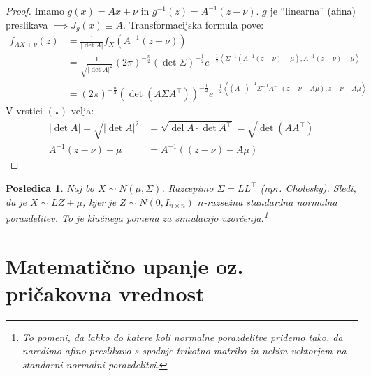 \documentclass[12pt]{book}
\theoremstyle{definition}
\theoremstyle{plain}
\theoremstyle{plain}
\theoremstyle{plain}
\theoremstyle{plain}
\newtheorem{posledica}{Posledica}
\theoremstyle{remark}
\begin{document}
\begin{proof}
    Imamo $g(x)=A x+\nu$ in $g^{-1}(z)=A^{-1}(z-\nu)$. $g$ je “linearna” (afina) preslikava $\implies J_g(x) \equiv A$. Transformacijska formula pove: 
    \begin{align*}
        f_{A X+\nu}(z)&=\frac{1}{|\det A|} f_X\left(A^{-1}(z-\nu)\right) \\
        &=\frac{1}{\sqrt{|\det A|^2}}(2 \pi)^{-\frac{n}{2}}(\det \Sigma)^{-\frac{1}{2}} e^{-\frac{1}{2}\left\langle\Sigma^{-1}\left(A^{-1}(z - \nu)-\mu\right), A^{-1}(z-\nu)-\mu\right\rangle} \tag{$\star$} \\
        &=(2 \pi)^{-\frac{n}{2}}\left(\det\left(A \Sigma A^{\top}\right)\right)^{-\frac{1}{2}} e^{-\frac{1}{2}\left\langle\left(A^{\top}\right)^{-1} \Sigma^{-1} A^{-1}(z-\nu-A \mu), z-\nu - A\mu\right\rangle} 
    \end{align*}
    V vrstici $(\star)$ velja: 
    $$
    \begin{aligned}
        |\det A|=\sqrt{|\operatorname{det} A|^2}&=\sqrt{\operatorname{del} A \cdot \operatorname{det} A^{\top}}=\sqrt{\operatorname{det}\left(A A^{\top}\right)} \\
         A^{-1}(z-\nu)-\mu&=A^{-1}\left((z-\nu)-A \mu\right)    
    \end{aligned}
    $$
\end{proof}

\begin{posledica}
    Naj bo $X \sim N(\mu, \Sigma)$. Razcepimo $\Sigma=L L^{\top}$ (npr. Cholesky). Sledi, da je $X \sim L Z+\mu$, kjer je $Z \sim N\left(0, I_{n \times n}\right)$ $n$-razsežna standardna normalna porazdelitev. To je klučnega pomena za simulacijo vzorčenja.\footnote[6]{To pomeni, da lahko do katere koli normalne porazdelitve pridemo tako, da naredimo afino preslikavo s spodnje trikotno matriko in nekim vektorjem na standarni normalni porazdelitvi.}
\end{posledica}

\chapter[Matematično upanje oz. pričakovna vrednost]{Matematično upanje oz. \\ pričakovna vrednost}
\end{document}
